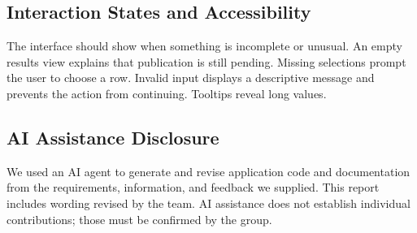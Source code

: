 \documentclass[12pt]{article}
\begin{document}
\subsection{Interaction States and Accessibility}
The interface should show when something is incomplete or unusual. An empty results view explains that publication is still pending. Missing selections prompt the user to choose a row. Invalid input displays a descriptive message and prevents the action from continuing. Tooltips reveal long values.

\subsection*{AI Assistance Disclosure}
We used an AI agent to generate and revise application code and documentation from the requirements, information, and feedback we supplied. This report includes wording revised by the team. AI assistance does not establish individual contributions; those must be confirmed by the group.
\end{document}
